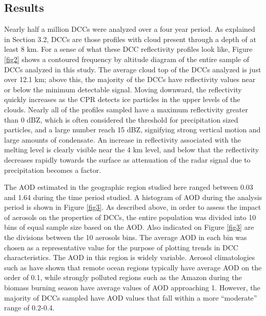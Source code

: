 \subsection{Results}
Nearly half a million DCCs were analyzed over a four year period.  As explained in Section 3.2, DCCs are those profiles with cloud present through a depth of at least 8 km.  For a sense of what these DCC reflectivity profiles look like, Figure \ref{fig2} shows a contoured frequency by altitude diagram \citep[CFAD, ][]{Yuter:1995p8937} of the entire sample of DCCs analyzed in this study.  The average cloud top of the DCCs analyzed is just over 12.1 km; above this, the majority of the DCCs have reflectivity values near or below the minimum detectable signal.  Moving downward, the reflectivity quickly increases as the CPR detects ice particles in the upper levels of the clouds.  Nearly all of the profiles sampled have a maximum reflectivity greater than 0 dBZ, which is often considered the threshold for precipitation sized particles, and a large number reach 15 dBZ, signifying strong vertical motion and large amounts of condensate.  An increase in reflectivity associated with the melting level is clearly visible near the 4 km level, and below that the reflectivity decreases rapidly towards the surface as attenuation of the radar signal due to precipitation becomes a factor.

The AOD estimated in the geographic region studied here ranged between 0.03 and 1.64 during the time period studied.  A histogram of AOD during the analysis period is shown in Figure \ref{fig3}.  As described above, in order to assess the impact of aerosols on the properties of DCCs, the entire population was divided into 10 bins of equal sample size based on the AOD.  Also indicated on Figure \ref{fig3} are the divisions between the 10 aerosols bins.  The average AOD in each bin was chosen as a representative value for the purpose of plotting trends in DCC characteristics.  The AOD in this region is widely variable.  Aerosol climatologies such as \citet{Remer:2008p8938} have shown that remote ocean regions typically have average AOD on the order of 0.1, while strongly polluted regions such as the Amazon during the biomass burning season have average values of AOD approaching 1.  However, the majority of DCCs sampled have AOD values that fall within a more ``moderate'' range of 0.2-0.4.

